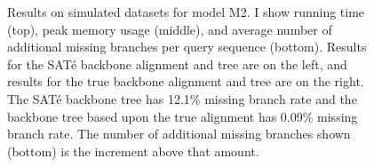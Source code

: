 \begin{figure}[htbp]
  \caption{Results on simulated datasets for model M2. I show running time (top), peak memory
usage (middle), and average number of additional missing branches per
query sequence (bottom).  Results for the SAT\'{e} backbone alignment and tree are on the
left, and results for the true backbone alignment and tree are on the
right.
The SAT\'{e} backbone tree has 12.1\% missing
branch rate and the backbone tree based upon the
true alignment has 0.09\% missing branch rate.
The number of additional missing branches shown (bottom) is the
increment above that amount.
}
  \label{fig:M2}
\end{figure}

